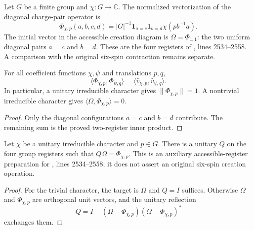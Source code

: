 \begin{definition}
    \label{def:peps_regular_charge_four_register}
    \leanok
    Let $G$ be a finite group and $\chi:G\to\mathbb C$.
    The normalized vectorization of the diagonal charge-pair operator is
    \[
        \Phi_{\chi,p}(a,b,c,d)
        =|G|^{-1}\mathbf1_{a=c}\mathbf1_{b=d}\chi(pb^{-1}a).
    \]
    The initial vector in the accessible creation diagram is
    $\Omega=\Phi_{1,1}$: the two uniform diagonal pairs $a=c$ and $b=d$.
    These are the four registers of
    \cite[charge-pair creation]{Schuch2010PEPS}, lines 2534--2558.
    A comparison with the original six-spin contraction remains separate.
\end{definition}

\begin{lemma}
    \label{thm:peps_regular_charge_four_register_inner}
    \leanok
    For all coefficient functions $\chi,\psi$ and translations $p,q$,
    \[
        \langle\Phi_{\chi,p},\Phi_{\psi,q}\rangle
        =\langle\widehat v_{\chi,p},\widehat v_{\psi,q}\rangle.
    \]
    In particular, a unitary irreducible character gives
    $\|\Phi_{\chi,p}\|=1$. A nontrivial irreducible character gives
    $\langle\Omega,\Phi_{\chi,p}\rangle=0$.
\end{lemma}
\begin{proof}\leanok
    Only the diagonal configurations $a=c$ and $b=d$ contribute.
    The remaining sum is the proved two-register inner product.
\end{proof}

\begin{lemma}
    \label{thm:peps_regular_charge_pair_preparation}
    \leanok
    Let $\chi$ be a unitary irreducible character and $p\in G$.
    There is a unitary $Q$ on the four group registers such that
    $Q\Omega=\Phi_{\chi,p}$.
    This is an auxiliary accessible-register preparation for
    \cite[charge-pair creation]{Schuch2010PEPS}, lines 2534--2558;
    it does not assert an original six-spin creation operation.
\end{lemma}
\begin{proof}\leanok
    For the trivial character, the target is $\Omega$ and $Q=I$ suffices.
    Otherwise $\Omega$ and $\Phi_{\chi,p}$ are orthogonal unit vectors, and the
    unitary reflection
    \[
        Q=I-(\Omega-\Phi_{\chi,p})(\Omega-\Phi_{\chi,p})^*
    \]
    exchanges them.
\end{proof}
